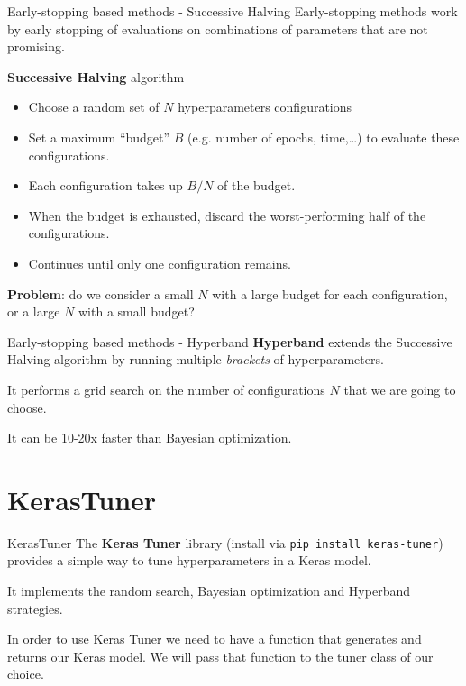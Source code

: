 \documentclass[9pt, aspectratio=169]{beamer}
\begin{document}
\begin{frame}
    {Early-stopping based methods - Successive Halving}
    Early-stopping methods work by early stopping of evaluations on combinations of parameters that are not promising.

    \textbf{Successive Halving} algorithm

    \begin{itemize}[<+->]
        \item Choose a random set of $N$ hyperparameters configurations
        \item Set a maximum ``budget'' $B$ (e.g. number of epochs, time,\dots) to evaluate these configurations.
        \item Each configuration takes up $B/N$ of the budget.
        \item When the budget is exhausted, discard the worst-performing half of the configurations.
        \item Continues until only one configuration remains.
    \end{itemize}
    \pause
    \textbf{Problem}: do we consider a small $N$ with a large budget for each configuration, or a large $N$ with a small budget?
\end{frame}

\begin{frame}
    {Early-stopping based methods - Hyperband}
    \textbf{Hyperband} extends the Successive Halving algorithm by running multiple \textit{brackets} of hyperparameters.

    It performs a grid search on the number of configurations $N$ that we are going to choose.

    It can be 10-20x faster than Bayesian optimization.
\end{frame}

\section{KerasTuner}

\begin{frame}
    {KerasTuner}
    The \textbf{Keras Tuner} library (install via \texttt{pip install keras-tuner}) provides a simple way to tune hyperparameters in a Keras model.

    It implements the random search, Bayesian optimization and Hyperband strategies.

    In order to use Keras Tuner we need to have a function that generates and returns our Keras model. We will pass that function to the tuner class of our choice.
\end{frame}
\end{document}
